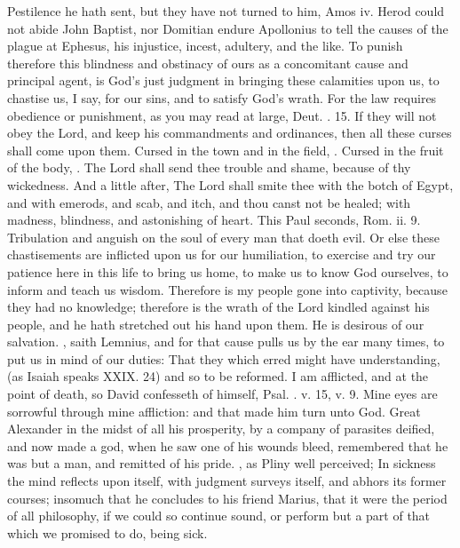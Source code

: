 {Pestilence he hath sent, but they have not turned to him, Amos iv. Herod could not abide John Baptist, nor Domitian endure Apollonius to tell the causes of the plague at Ephesus, his injustice, incest, adultery, and the like.
To punish therefore this blindness and obstinacy of ours as a concomitant cause and principal agent, is God's just judgment in bringing these calamities upon us, to chastise us, I say, for our sins, and to satisfy God's wrath.
For the law requires obedience or punishment, as you may read at large, Deut. . 15. If they will not obey the Lord, and keep his commandments and ordinances, then all these curses shall come upon them. Cursed in the town and in the field, \etc{}.
Cursed in the fruit of the body, \etc{}.
The Lord shall send thee trouble and shame, because of thy wickedness.
And a little after, The Lord shall smite thee with the botch of Egypt, and with emerods, and scab, and itch, and thou canst not be healed; with madness, blindness, and astonishing of heart.
This Paul seconds, Rom. ii. 9.
Tribulation and anguish on the soul of every man that doeth evil.
Or else these chastisements are inflicted upon us for our humiliation, to exercise and try our patience here in this life to bring us home, to make us to know God ourselves, to inform and teach us wisdom.
Therefore is my people gone into captivity, because they had no knowledge; therefore is the wrath of the Lord kindled against his people, and he hath stretched out his hand upon them.
He is desirous of our salvation.
, saith Lemnius, and for that cause pulls us by the ear many times, to put us in mind of our duties: That they which erred might have understanding, (as Isaiah speaks XXIX. 24) and so to be reformed.
I am afflicted, and at the point of death, so David confesseth of himself, Psal. . v. 15, v. 9.
Mine eyes are sorrowful through mine affliction: and that made him turn unto God.
Great Alexander in the midst of all his prosperity, by a company of parasites deified, and now made a god, when he saw one of his wounds bleed, remembered that he was but a man, and remitted of his pride.
, as Pliny well perceived; In sickness the mind reflects upon itself, with judgment surveys itself, and abhors its former courses; insomuch that he concludes to his friend Marius, that it were the period of all philosophy, if we could so continue sound, or perform but a part of that which we promised to do, being sick.
}
